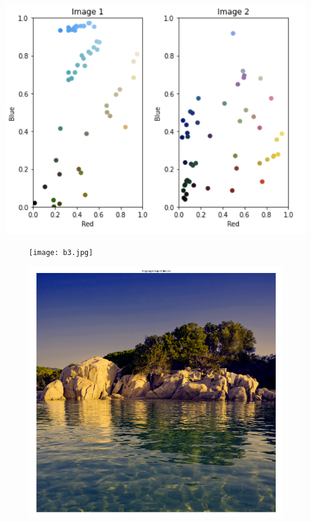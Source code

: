 \documentclass{beamer}
\theoremstyle{definition}
\begin{document}
\begin{frame}
	
	\centering
	
	\includegraphics[scale= 0.65]{b32.png}
\end{frame}

\begin{frame}
	
	\begin{minipage}[t]{1\linewidth}\centering
	\begin{minipage}{0.4\linewidth}\centering\begin{figure}
	\centering
	\texttt{[image: b3.jpg]}
	\end{figure}\end{minipage} \quad \quad 
	\begin{minipage}{0.41\linewidth}\centering\begin{figure}
	\centering
	\includegraphics[scale=0.27]{b34.png}	
	\end{figure}\end{minipage}
	\end{minipage}
	
	
\end{frame}
\end{document}
